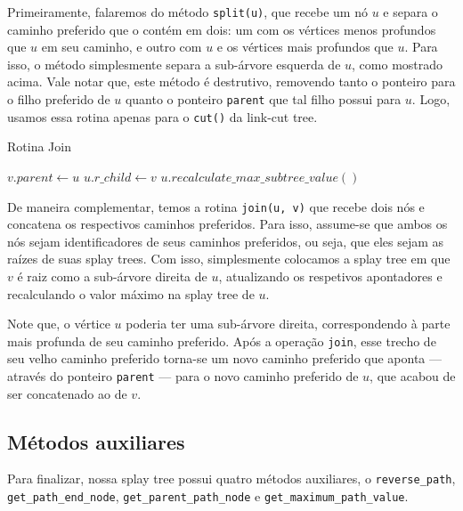 Primeiramente, falaremos do método \texttt{split(u)}, que recebe um nó $u$ e separa o caminho preferido que o contém em dois: um com os vértices menos profundos que $u$ em seu caminho, e outro com $u$ e os vértices mais profundos que $u$. Para isso, o método simplesmente separa a sub-árvore esquerda de $u$, como mostrado acima. Vale notar que, este método é destrutivo, removendo tanto o ponteiro para o filho preferido de $u$ quanto o ponteiro \texttt{parent} que tal filho possui para $u$. Logo, usamos essa rotina apenas para o \texttt{cut()} da link-cut tree.

\begin{algorithm}[h!]
    \caption{Rotina Join}\label{splay:join}
    \begin{algorithmic}
        \State $v.parent \gets u$
        \EndIf
        \State $u.r\_child \gets v$
        \State {}
        \State $u.recalculate\_max\_subtree\_value()$
        \EndFunction
    \end{algorithmic}
\end{algorithm}

De maneira complementar, temos a rotina \texttt{join(u, v)} que recebe dois nós e concatena os respectivos caminhos preferidos. Para isso, assume-se que ambos os nós sejam identificadores de seus caminhos preferidos, ou seja, que eles sejam as raízes de suas splay trees. Com isso, simplesmente colocamos a splay tree em que $v$ é raiz como a sub-árvore direita de $u$, atualizando os respetivos apontadores e recalculando o valor máximo na splay tree de $u$.

Note que, o vértice $u$ poderia ter uma sub-árvore direita, correspondendo à parte mais profunda de seu caminho preferido. Após a operação \texttt{join}, esse trecho de seu velho caminho preferido torna-se um novo caminho preferido que aponta --- através do ponteiro \texttt{parent} --- para o novo caminho preferido de $u$, que acabou de ser concatenado ao de $v$.

\subsection{Métodos auxiliares}
\label{subsection:lct-splay-aux}

Para finalizar, nossa splay tree possui quatro métodos auxiliares, o \texttt{reverse\_path}, \texttt{get\_path\_end\_node}, \texttt{get\_parent\_path\_node} e \texttt{get\_maximum\_path\_value}.

